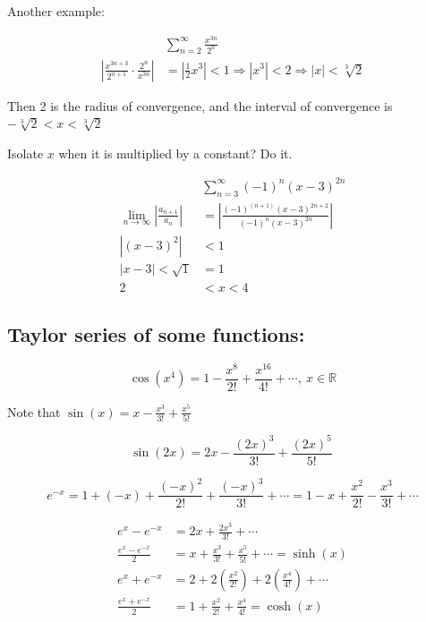 \documentclass[12pt]{article}
\theoremstyle{plain}
\theoremstyle{remark}
\theoremstyle{definition}
\begin{document}
Another example:

\begin{align*}
&\sum_{n = 2}^{\infty}\frac{x^{3n}}{2^{n}} \\
\left| \frac{x^{3n + 3}}{2^{n + 1}} \cdot \frac{2^{n}}{x^{3n}} \right| &= \left| \frac{1}{2}x^{3} \right| < 1 \Rightarrow \left| x^{3} \right| < 2 \Rightarrow |x| < \sqrt[3]{2}
\end{align*}


Then 2 is the radius of convergence, and the interval of convergence is
\(- \sqrt[3]{2} < x < \sqrt[3]{2}\)

Isolate \(x\) when it is multiplied by a constant? Do it.

\begin{align*}
&\sum_{n = 3}^{\infty}{( - 1)^{n}(x - 3)^{2n}} \\
\lim_{n \rightarrow \infty}\left| \frac{a_{n + 1}}{a_{n}} \right| &= \left| \frac{( - 1)^{(n + 1)}(x - 3)^{2n + 2}}{( - 1)^{n}(x - 3)^{2n}} \right| \\
\left| (x - 3)^{2} \right| &< 1 \\
|x - 3| < \sqrt{1} &= 1 \\
2 &< x < 4
\end{align*}



\subsection{Taylor series of some
functions:}

\[\cos\left( x^{4} \right) = 1 - \frac{x^{8}}{2!} + \frac{x^{16}}{4!} + \cdots,\ x\mathbb{\in R}\]

Note that \(\sin(x) = x - \frac{x^{3}}{3!} + \frac{x^{5}}{5!}\)

\[\sin(2x) = 2x - \frac{(2x)^{3}}{3!} + \frac{(2x)^{5}}{5!}\ \]

\[e^{- x} = 1 + ( - x) + \frac{( - x)^{2}}{2!} + \frac{( - x)^{3}}{3!} + \cdots = 1 - x + \frac{x^{2}}{2!} - \frac{x^{3}}{3!} + \cdots\]

\begin{align*}
e^{x} - e^{- x} &= 2x + \frac{2x^{3}}{3!} + \cdots \\
\frac{e^{x} - e^{- x}}{2} &= x + \frac{x^{3}}{3!} + \frac{x^{5}}{5!} + \cdots = \sinh(x) \\
e^{x} + e^{- x} &= 2 + 2\left( \frac{x^{2}}{2!} \right) + 2\left( \frac{x^{4}}{4!} \right) + \cdots \\
\frac{e^{x} + e^{- x}}{2} &= 1 + \frac{x^{2}}{2!} + \frac{x^{4}}{4!} = \cosh(x)
\end{align*}
\end{document}
